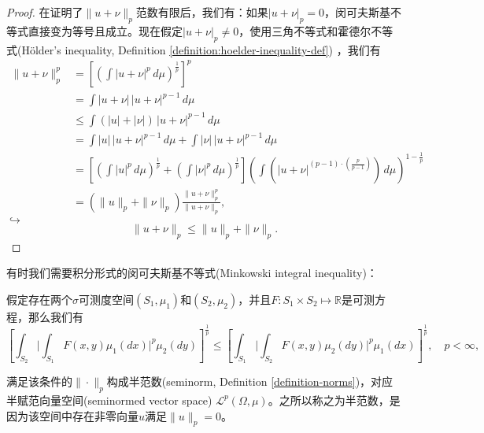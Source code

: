 \begin{definition}[闵可夫斯基不等式]
\begin{proof}
在证明了$\|u+\nu\|_p$范数有限后，我们有：如果$|u + \nu|_p=0$，闵可夫斯基不等式直接变为等号且成立。现在假定$|u + \nu|_p \neq 0$，使用三角不等式和霍德尔不等式(Hölder's inequality, Definition \eqref{definition:hoelder-inequality-def}) ，我们有
\begin{equation*}
\begin{split}
    \|u + \nu \|_p^p &= \left[ \left( \int |u + \nu|^p \, d \mu \right)^{\frac{1}{p}} \right]^{p} \\
    &= \int |u + \nu| \, |u + \nu|^{p-1} \, d \mu \\
    &\le \int \left( |u| + |\nu| \right) \, |u + \nu|^{p-1} \, d \mu\\
    & = \int |u| \, |u + \nu|^{p-1} \, d \mu + \int |\nu| \, |u + \nu|^{p-1} \, d \mu \\
    &=\left[ \left( \int |u|^p \, d \mu \right)^{\frac{1}{p}}  + \left( \int |\nu|^p \, d \mu \right)^{\frac{1}{p}}\right] \left(
    \int \left( \big| u + \nu \big|^{\left(p-1\right) \cdot \left( \frac{p}{p-1} \right)}  \right) \, d \mu
    \right)^{1-\frac{1}{p}}\\
    &= \left( \|u \|_p + \| \nu \|_p \right) \frac{\|u+\nu\|_{p}^{p}}{\| u + \nu \|_p},
\end{split}
\end{equation*}
$\hookrightarrow$
\begin{equation*}
  \| u + \nu \|_p \le \|u \|_p + \| \nu \|_p.
\end{equation*}
\end{proof}
\end{definition}

  有时我们需要积分形式的闵可夫斯基不等式(Minkowski integral inequality)：
\begin{definition}[闵可夫斯基积分不等式]
  \label{sec:minkowski-ineq-int-def}
  假定存在两个$\sigma$可测度空间$(S_1, \mu_1)$和$(S_2, \mu_2)$，并且$F:S_1 \times S_2 \mapsto \mathbb{R}$是可测方程，那么我们有
  \begin{equation*}
    \left[ \int_{S_2} \Big| \int_{S_1} F(x,y) \mu_1(d x) \Big|^{p} \mu_2 (d y)\right]^{\frac{1}{p}} \le
    \left[ \int_{S_1} \Big| \int_{S_2} F(x,y) \mu_2(d y) \Big|^{p} \mu_1 (d x)\right]^{\frac{1}{p}}, \quad p < \infty,
  \end{equation*}
\end{definition}

满足该条件的$\| \cdot \|_p$构成半范数(seminorm, Definition \ref{definition-norms})，对应半赋范向量空间(seminormed vector space) $\mathcal{L}^p(\Omega,\mu)$。之所以称之为半范数，是因为该空间中存在非零向量$u$满足$\| u \|_p = 0$。

